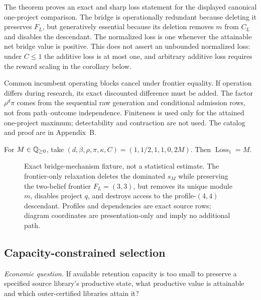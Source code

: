 The theorem proves an exact and sharp loss statement for the displayed
canonical one-project comparison.  The bridge is operationally redundant
because deleting it preserves \(F_L\), but generatively essential because its
deletion removes \(m\) from \(C_L\) and disables the descendant.  The
normalized loss is one whenever the attainable net bridge value is positive.
This does not assert an unbounded normalized loss: under \(C\le1\) the
additive loss is at most one, and arbitrary additive loss requires the reward
scaling in the corollary below.

Common incumbent operating blocks cancel under frontier equality.  If
operation differs during research, its exact discounted difference must be
added.  The factor \(\rho^d\pi\) comes from the sequential raw generation and
conditional admission rows, not from path--outcome independence.  Finiteness
is used only for the attained one-project maximum; detectability and
contraction are not used.  The catalog and proof are in Appendix~B.

\begin{corollary}
\label{thm:scaled-frontier-pruning-loss}
For \(M\in\mathbb{Q}_{\ge0}\), take
\((d,\beta,\rho,\pi,\kappa,C)=(1,1/2,1,1,0,2M)\).  Then
\(\operatorname{Loss}_1=M\).
\end{corollary}

\begin{figure}[ht]
\centering

\caption{Exact bridge-mechanism fixture, not a statistical estimate.  The
frontier-only relaxation deletes the dominated \(s_M\) while preserving the
two-belief frontier \(F_L=(3,3)\), but removes its unique module \(m\),
disables project \(q\), and destroys access to the profile-\((4,4)\)
descendant.  Profiles and dependencies are exact source rows; diagram
coordinates are presentation-only and imply no additional path.}
\label{fig:innovation-safe-bridge}
\end{figure}

\subsection{Capacity-constrained selection}
\label{subsec:resource-statics}

\emph{Economic question.}  If available retention capacity is too small to
preserve a specified source library's productive state, what productive value
is attainable and which outer-certified libraries attain it?

